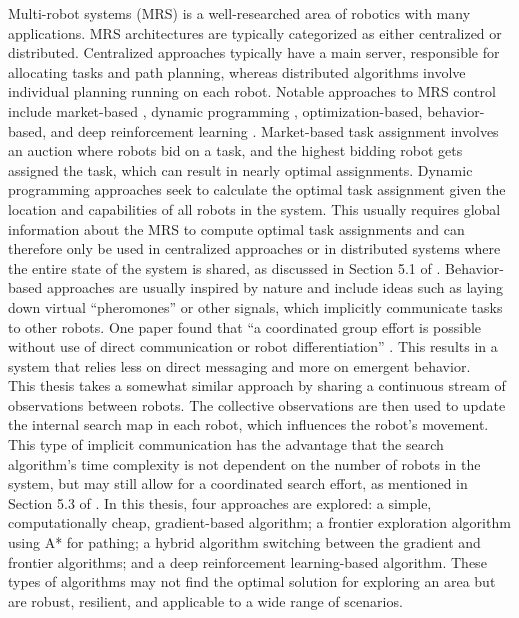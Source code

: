 Multi-robot systems (MRS) is a well-researched area of robotics with many applications. MRS architectures are typically categorized as either centralized or distributed. Centralized approaches typically have a main server, responsible for allocating tasks and path planning, whereas distributed algorithms involve individual planning running on each robot. Notable approaches to MRS control include market-based \cite{trigui2014market}, dynamic programming \cite{kato2011dp}, optimization-based, behavior-based, and deep reinforcement learning \cite{huttenrauch2019deep-swarm}. Market-based task assignment involves an auction where robots bid on a task, and the highest bidding robot gets assigned the task, which can result in nearly optimal assignments. Dynamic programming approaches seek to calculate the optimal task assignment given the location and capabilities of all robots in the system. This usually requires global information about the MRS to compute optimal task assignments and can therefore only be used in centralized approaches or in distributed systems where the entire state of the system is shared, as discussed in Section 5.1 of \cite{multi-robot-search-moving-target}. Behavior-based approaches are usually inspired by nature and include ideas such as laying down virtual “pheromones” or other signals, which implicitly communicate tasks to other robots. One paper found that “a coordinated group effort is possible without use of direct communication or robot differentiation” \cite{kube2000cooperative-ants}. This results in a system that relies less on direct messaging and more on emergent behavior. \\

This thesis takes a somewhat similar approach by sharing a continuous stream of observations between robots. The collective observations are then used to update the internal search map in each robot, which influences the robot's movement. This type of implicit communication has the advantage that the search algorithm's time complexity is not dependent on the number of robots in the system, but may still allow for a coordinated search effort, as mentioned in Section 5.3 of \cite{multi-robot-search-moving-target}. In this thesis, four approaches are explored: a simple, computationally cheap, gradient-based algorithm; a frontier exploration algorithm using A* for pathing; a hybrid algorithm switching between the gradient and frontier algorithms; and a deep reinforcement learning-based algorithm. These types of algorithms may not find the optimal solution for exploring an area but are robust, resilient, and applicable to a wide range of scenarios.
